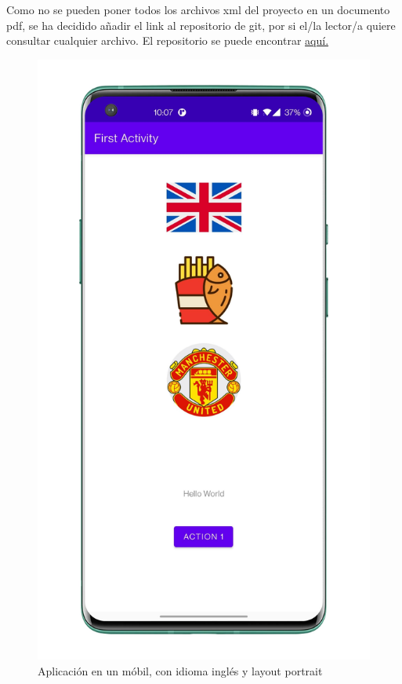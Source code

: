 \documentclass[12pt, letterpaper]{article}
\begin{document}
Como no se pueden poner todos los archivos xml del proyecto en un documento pdf, se ha decidido añadir el link al repositorio de git, por 
si el/la lector/a quiere consultar cualquier archivo. El repositorio se puede encontrar \href{https://github.com/Pablito2020/First-Activity}{aquí.}

\begin{figure}[!htbp]
    \includegraphics[scale = 0.12]{smartphone-vertical.jpg}
    \centering
    \caption{Aplicación en un móbil, con idioma inglés y layout portrait}
    \label{vertical}
\end{figure}
\end{document}
